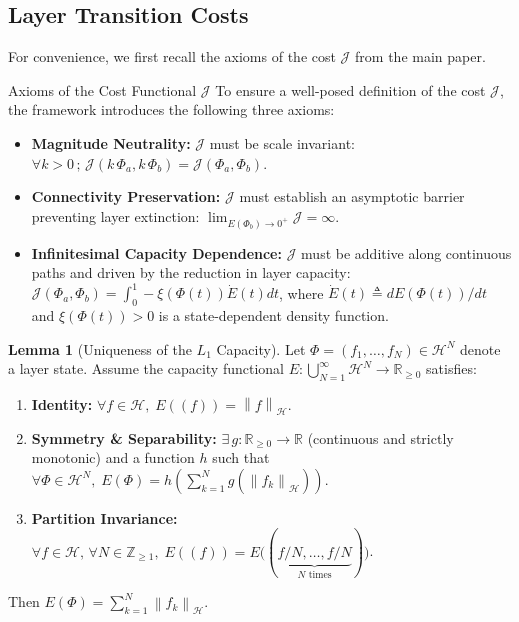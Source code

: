 \documentclass[11pt, a4paper, copyright, gdm]{google}
\newcommand{\norm}[1]{\left\lVert#1\right\rVert}
\newcommand{\calH}{\mathcal{H}}
\newcommand{\calJ}{\mathcal{J}}
\newcommand{\R}{\mathbb{R}}
\theoremstyle{definition}
\newtheorem{lemma}[theorem]{Lemma}
\begin{document}
\subsection{Layer Transition Costs}

For convenience, we first recall the axioms of the cost $\calJ$ from the main paper.

\begin{insight}{Axioms of the Cost Functional $\calJ$}
To ensure a well-posed definition of the cost $\calJ$, the framework introduces the following three axioms:
\begin{itemize}
    \item \textbf{Magnitude Neutrality:} $\calJ$ must be scale invariant: $\forall k > 0 \,;\, \calJ(k\, \Phi_a , k\, \Phi_b) = \calJ(\Phi_a , \Phi_b)$.
    \item \textbf{Connectivity Preservation:} $\calJ$ must establish an asymptotic barrier preventing layer extinction: $\lim_{E(\Phi_b) \rightarrow 0^+} \calJ = \infty$.
    \item \textbf{Infinitesimal Capacity Dependence:} $\calJ$ must be additive along continuous paths and driven by the reduction in layer capacity: $\calJ(\Phi_a, \Phi_b) = \int_{0}^{1} -\xi(\Phi(t)) \dot{E}(t) dt$, where $\dot{E}(t) \triangleq dE(\Phi(t))/dt$ and $\xi(\Phi(t)) > 0$ is a state-dependent density function.
\end{itemize}
\end{insight}

\begin{lemma}[Uniqueness of the $L_1$ Capacity]
\label{prop:unique_l1}
Let $\Phi = (f_1, \dots, f_N) \in \calH^N$ denote a layer state. Assume the capacity functional $E: \bigcup_{N=1}^\infty \calH^N \to \R_{\ge 0}$ satisfies:
\begin{enumerate}
    \item \textbf{Identity:} $\forall f \in \calH, \; E((f)) = \norm{f}_{\calH}$.
    \item \textbf{Symmetry \& Separability:} $\exists \, g: \R_{\ge 0} \to \R$ (continuous and strictly monotonic) and a function $h$ such that $\forall \Phi \in \calH^N, \; E(\Phi) = h\left( \sum_{k=1}^N g(\norm{f_k}_{\calH}) \right)$.
    \item \textbf{Partition Invariance:} $\forall f \in \calH, \, \forall N \in \mathbb{Z}_{\ge 1}, \; E((f)) = E\big((\underbrace{f/N, \dots, f/N}_{N \text{ times}})\big)$.
\end{enumerate}
Then $E(\Phi) = \sum_{k=1}^N \norm{f_k}_{\calH}$.
\end{lemma}
\end{document}
